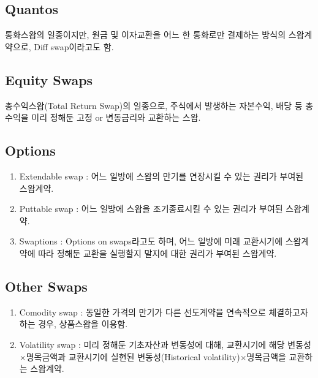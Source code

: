 \documentclass[
  letterpaper,
  DIV=11,
  numbers=noendperiod]{scrreprt}
\providecommand{\tightlist}{%
  \setlength{\itemsep}{0pt}\setlength{\parskip}{0pt}}\usepackage{longtable,booktabs,array}
\begin{document}
\subsection*{Quantos}\label{quantos}

통화스왑의 일종이지만, 원금 및 이자교환을 어느 한 통화로만 결제하는
방식의 스왑계약으로, Diff swap이라고도 함.

\subsection*{Equity Swaps}\label{equity-swaps}

총수익스왑(Total Return Swap)의 일종으로, 주식에서 발생하는 자본수익,
배당 등 총수익을 미리 정해둔 고정 or 변동금리와 교환하는 스왑.

\subsection*{Options}\label{options}

\begin{enumerate}
\def\labelenumi{(\arabic{enumi})}
\tightlist
\item
  Extendable swap : 어느 일방에 스왑의 만기를 연장시킬 수 있는 권리가
  부여된 스왑계약.
\item
  Puttable swap : 어느 일방에 스왑을 조기종료시킬 수 있는 권리가 부여된
  스왑계약.
\item
  Swaptions : Options on swaps라고도 하며, 어느 일방에 미래 교환시기에
  스왑계약에 따라 정해둔 교환을 실행할지 말지에 대한 권리가 부여된
  스왑계약.
\end{enumerate}

\subsection*{Other Swaps}\label{other-swaps}

\begin{enumerate}
\def\labelenumi{(\arabic{enumi})}
\tightlist
\item
  Comodity swap : 동일한 가격의 만기가 다른 선도계약을 연속적으로
  체결하고자 하는 경우, 상품스왑을 이용함.
\item
  Volatility swap : 미리 정해둔 기초자산과 변동성에 대해, 교환시기에
  해당 변동성\(\times\)명목금액과 교환시기에 실현된 변동성(Historical
  volatility)\(\times\)명목금액을 교환하는 스왑계약.
\end{enumerate}
\end{document}
